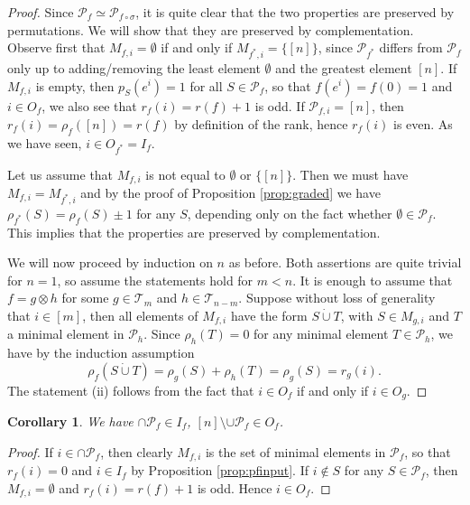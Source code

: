 \documentclass[12pt]{article}
\newtheorem{coro}{Corollary}
\theoremstyle{definition}
\theoremstyle{remark}
\def\Te{\mathcal T}
\def\Pe{\mathcal P}
\begin{document}
\begin{proof} Since $\Pe_f\simeq \Pe_{f\circ\sigma}$, it is
quite clear that the two properties are preserved by permutations. We will show that they
are preserved by complementation. Observe first that $M_{f,i}=\emptyset$ if and only if
$M_{f^*,i}=\{[n]\}$, since $\Pe_{f^*}$ differs from $\Pe_f$ only up to adding/removing the
least element $\emptyset$ and the greatest element $[n]$. If $M_{f,i}$ is empty, then $p_S(e^i)=1$ for all $S\in
\Pe_f$, so that $f(e^i)=f(0)=1$ and $i\in O_f$, we also see that $r_f(i)=r(f)+1$ is odd.
If $\Pe_{f,i}=[n]$, then $r_f(i)=\rho_f([n])=r(f)$ by definition of the rank, hence
$r_{f}(i)$ is even. As we have seen, $i\in O_{f^*}=I_f$. 

Let us assume that $M_{f,i}$ is not equal to $\emptyset$ or $\{[n]\}$. Then we must have
$M_{f,i}=M_{f^*,i}$ and by the
proof of Proposition \ref{prop:graded} we have  
$\rho_{f^*}(S)=\rho_f(S)\pm 1$ for any $S$, depending only on the fact whether $\emptyset
\in \Pe_f$. This implies that the properties are preserved by complementation.  


We will now proceed by induction on $n$ as before. Both  assertions are quite trivial for $n=1$,
so assume the statements hold for $m<n$. It is enough to assume that
$f=g\otimes h$ for some $g\in \Te_m$ and $h\in \Te_{n-m}$. 
Suppose without loss of generality that $i\in [m]$, then all elements of $M_{f,i}$ have
the form $S\dot{\cup} T$, with $S\in M_{g,i}$ and  $T$ a minimal element in $\Pe_h$. 
 Since $\rho_h(T)=0$ for any minimal element $T\in \Pe_h$, we have
by the induction assumption
\[
\rho_f(S\dot{\cup} T)=\rho_g(S)+\rho_h(T)=\rho_g(S)= r_g(i).
\]
The statement (ii) follows from the fact that $i\in O_f$ if and only if $i\in O_g$.


\end{proof}

\begin{coro}\label{coro:free} We have $\cap{\Pe_f}\in I_f$, $[n]\setminus\cup{\Pe_f}\in O_f$.

\end{coro}

\begin{proof} If $i\in \cap\Pe_f$, then clearly $M_{f,i}$ is the set of minimal elements
in $\Pe_f$, so that $r_f(i)=0$ and $i\in I_f$ by Proposition \ref{prop:pfinput}. If
$i\notin S$ for any $S\in \Pe_f$, then $M_{f,i}=\emptyset$ and $r_f(i)=r(f)+1$ is odd.
Hence $i\in O_f$. 

\end{proof}
\end{document}
